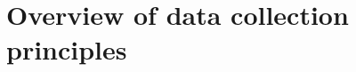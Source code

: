 %
%
%
%
%
%
%
%
%
%


\section{Overview of data collection principles}
\label{overviewOfDataCollectionPrinciples}

